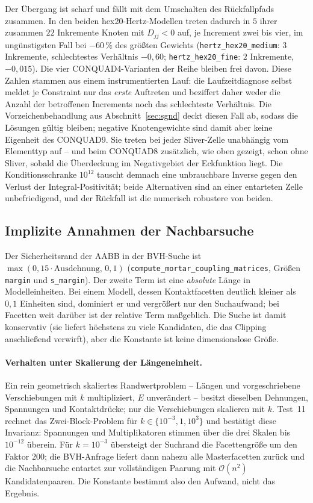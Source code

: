 \documentclass[a4paper,11pt]{article}
\def\tilde#1{#1}%
\newcommand{\code}[1]{\texttt{\small #1}}
\newcommand{\file}[1]{\texttt{\small #1}}
\begin{document}
\noindent Der Übergang ist scharf und fällt mit dem Umschalten des Rückfallpfads zusammen. In den
beiden hex20-Hertz-Modellen treten dadurch in $5$ ihrer zusammen $22$ Inkremente Knoten mit
$\tilde D_{jj}<0$ auf, je Increment zwei bis vier, im ungünstigsten Fall bei $-60\,\%$ des
größten Gewichts (\file{hertz\_hex20\_medium}: $3$ Inkremente, schlechtestes Verhältnis $-0{,}60$;
\file{hertz\_hex20\_fine}: $2$ Inkremente, $-0{,}015$). Die vier CONQUAD4-Varianten der Reihe
bleiben frei davon. Diese Zahlen stammen aus einem instrumentierten Lauf: die Laufzeitdiagnose
selbst meldet je Constraint nur das \emph{erste} Auftreten und beziffert daher weder die Anzahl
der betroffenen Increments noch das schlechteste Verhältnis. Die
Vorzeichenbehandlung aus Abschnitt~\ref{sec:sgnd} deckt diesen Fall ab, sodass die Lösungen
gültig bleiben; negative Knotengewichte sind damit aber keine Eigenheit des CONQUAD9. Sie treten
bei jeder Sliver-Zelle unabhängig vom Elementtyp auf -- und beim CONQUAD8 zusätzlich, wie oben
gezeigt, schon ohne Sliver, sobald die Überdeckung im Negativgebiet der Eckfunktion liegt. Die
Konditionsschranke $10^{12}$
tauscht demnach eine unbrauchbare Inverse gegen den Verlust der Integral-Positivität; beide
Alternativen sind an einer entarteten Zelle unbefriedigend, und der Rückfall ist die numerisch
robustere von beiden.

\subsection{Implizite Annahmen der Nachbarsuche}
Der Sicherheitsrand der AABB in der BVH-Suche ist
$\max(0{,}15\cdot\text{Ausdehnung},\,0{,}1)$ (\code{compute\_mortar\_coupling\_matrices}, Größen
\code{margin} und \code{s\_margin}). Der
zweite Term ist eine \emph{absolute} Länge in Modelleinheiten. Bei einem Modell, dessen
Kontaktfacetten deutlich kleiner als $0{,}1$ Einheiten sind, dominiert er und vergrößert nur den
Suchaufwand; bei Facetten weit darüber ist der relative Term maßgeblich. Die Suche ist damit
konservativ (sie liefert höchstens zu viele Kandidaten, die das Clipping anschließend verwirft),
aber die Konstante ist keine dimensionslose Größe.

\paragraph{Verhalten unter Skalierung der Längeneinheit.}
Ein rein geometrisch skaliertes Randwertproblem -- Längen und vorgeschriebene Verschiebungen mit
$k$ multipliziert, $E$ unverändert -- besitzt dieselben Dehnungen, Spannungen und Kontaktdrücke;
nur die Verschiebungen skalieren mit $k$. Test~11 rechnet das Zwei-Block-Problem für
$k\in\{10^{-3},1,10^{3}\}$ und bestätigt diese Invarianz: Spannungen und Multiplikatoren stimmen
über die drei Skalen bis $10^{-12}$ überein. Für $k=10^{-3}$ übersteigt der Suchrand die
Facettengröße um den Faktor $200$; die BVH-Anfrage liefert dann nahezu alle Masterfacetten zurück
und die Nachbarsuche entartet zur vollständigen Paarung mit $\mathcal O(n^2)$ Kandidatenpaaren. Die
Konstante bestimmt also den Aufwand, nicht das Ergebnis.
\end{document}

